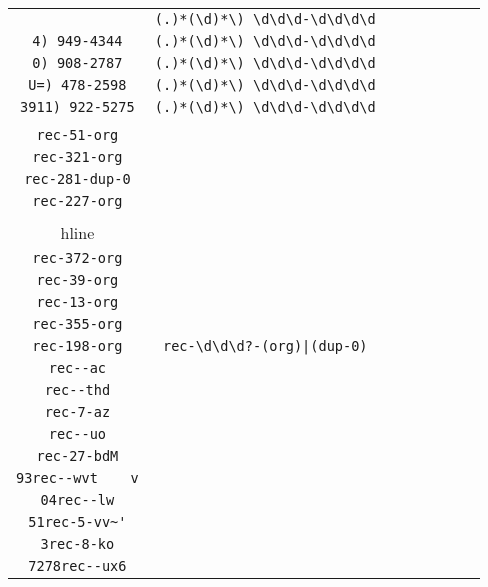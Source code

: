 \begin{longtable}{cccccccc}
\begin{tabular}{ll}
    \verb|) 768-7648| & \verb|(.)*(\d)*\) \d\d\d-\d\d\d\d|\\
\verb|4) 949-4344| & \verb|(.)*(\d)*\) \d\d\d-\d\d\d\d|\\
\verb|0) 908-2787| & \verb|(.)*(\d)*\) \d\d\d-\d\d\d\d|\\
\verb|U=) 478-2598| & \verb|(.)*(\d)*\) \d\d\d-\d\d\d\d|\\
\verb|3911) 922-5275| & \verb|(.)*(\d)*\) \d\d\d-\d\d\d\d|
\end{tabular}
\\\midrule 
\begin{tabular}{l}
    \verb|rec-93-org|\\
\verb|rec-51-org|\\
\verb|rec-321-org|\\
\verb|rec-281-dup-0|\\
\verb|rec-227-org|\\
\\hline\\
\verb|rec-372-org|\\
\verb|rec-39-org|\\
\verb|rec-13-org|\\
\verb|rec-355-org|\\
\verb|rec-198-org|
\end{tabular}

&
\verb.rec-\d\d\d?-(org)|(dup-0).
&

\begin{tabular}{l}
    \verb|(\d)*rec-(\d)*-\l\l(.)*|\\
\verb|rec--ac|\\
\verb|rec--thd|\\
\verb|rec-7-az|\\
\verb|rec--uo|\\
\verb|rec-27-bdM|
\end{tabular}

&

\begin{tabular}{l}
    \verb|(\d)*rec-(\d)*-\l\l(.)*|\\
\verb|93rec--wvt	v|\\
\verb|04rec--lw|\\
\verb|51rec-5-vv~'|\\
\verb|3rec-8-ko|\\
\verb|7278rec--ux6|
\end{tabular}

&


\end{longtable}
